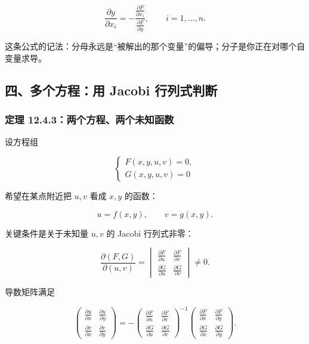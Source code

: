 \[
      \frac{\partial y}{\partial x_i}
      =
      -\frac{\frac{\partial F}{\partial x_i}}
      {\frac{\partial F}{\partial y}},
      \qquad i=1,\ldots,n.
    \]

\begin{notebox}
这条公式的记法：分母永远是“被解出的那个变量”的偏导；分子是你正在对哪个自变量求导。
\end{notebox}

\subsection*{四、多个方程：用 Jacobi 行列式判断}

\subsubsection*{定理 12.4.3：两个方程、两个未知函数}

设方程组

\[
      \begin{cases}
      F(x,y,u,v)=0,\\
      G(x,y,u,v)=0
      \end{cases}
    \]

希望在某点附近把 \(u,v\) 看成 \(x,y\) 的函数：

\[
      u=f(x,y),\qquad v=g(x,y).
    \]

关键条件是关于未知量 \(u,v\) 的 Jacobi 行列式非零：

\[
      \frac{\partial(F,G)}{\partial(u,v)}
      =
      \begin{vmatrix}
      \frac{\partial F}{\partial u} & \frac{\partial F}{\partial v}\\
      \frac{\partial G}{\partial u} & \frac{\partial G}{\partial v}
      \end{vmatrix}
      \ne0.
    \]

导数矩阵满足

\[
      \begin{pmatrix}
      \frac{\partial u}{\partial x} & \frac{\partial u}{\partial y}\\
      \frac{\partial v}{\partial x} & \frac{\partial v}{\partial y}
      \end{pmatrix}
      =
      -
      \begin{pmatrix}
      \frac{\partial F}{\partial u} & \frac{\partial F}{\partial v}\\
      \frac{\partial G}{\partial u} & \frac{\partial G}{\partial v}
      \end{pmatrix}^{-1}
      \begin{pmatrix}
      \frac{\partial F}{\partial x} & \frac{\partial F}{\partial y}\\
      \frac{\partial G}{\partial x} & \frac{\partial G}{\partial y}
      \end{pmatrix}.
    \]

